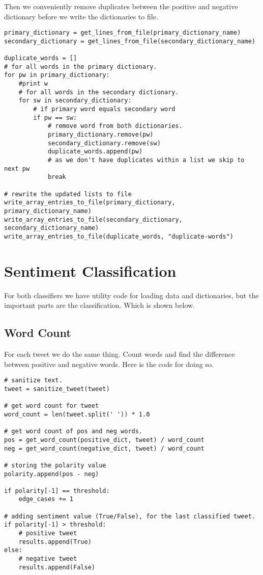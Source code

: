 Then we conveniently remove duplicates between the positive and negative
dictionary before we write the dictionaries to file. 
\begin{verbatim}
primary_dictionary = get_lines_from_file(primary_dictionary_name)
secondary_dictionary = get_lines_from_file(secondary_dictionary_name)

duplicate_words = []
# for all words in the primary dictionary.
for pw in primary_dictionary:
    #print w
    # for all words in the secondary dictionary.
    for sw in secondary_dictionary:
        # if primary word equals secondary word
        if pw == sw:
            # remove word from both dictionaries.
            primary_dictionary.remove(pw)
            secondary_dictionary.remove(sw)
            duplicate_words.append(pw)
            # as we don't have duplicates within a list we skip to next pw
            break

# rewrite the updated lists to file
write_array_entries_to_file(primary_dictionary, primary_dictionary_name)
write_array_entries_to_file(secondary_dictionary, secondary_dictionary_name)
write_array_entries_to_file(duplicate_words, "duplicate-words")
\end{verbatim}
%

\section{Sentiment Classification}\label{code:sentiment_classification}
For both classifiers we have utility code for loading data and dictionaries,
but the important parts are the classification. Which is shown below. 

\subsection{Word Count}
For each tweet we do the same thing. Count words and find the difference
between positive and negative words. Here is the code for doing so.   
\begin{verbatim}
# sanitize text.
tweet = sanitize_tweet(tweet)

# get word count for tweet
word_count = len(tweet.split(' ')) * 1.0

# get word count of pos and neg words.
pos = get_word_count(positive_dict, tweet) / word_count
neg = get_word_count(negative_dict, tweet) / word_count

# storing the polarity value
polarity.append(pos - neg)

if polarity[-1] == threshold:
    edge_cases += 1

# adding sentiment value (True/False), for the last classified tweet.
if polarity[-1] > threshold:
    # positive tweet
    results.append(True)
else:
    # negative tweet
    results.append(False)
\end{verbatim}

